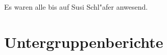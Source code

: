 \documentclass[a4paper]{protocol}
\date{9. Juni 1997}
\begin{document}
\begin{Persons}
Es waren alle bis auf Susi Schl"afer anwesend.
\end{Persons}

\section{Untergruppenberichte}
\end{document}

